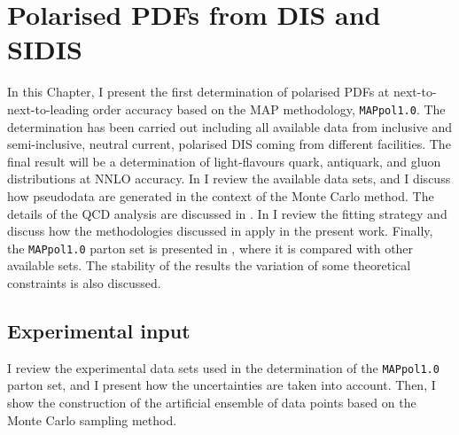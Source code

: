 \chapter{Polarised PDFs from DIS and SIDIS}
\label{ch:4}

In this Chapter, I present the first determination of polarised PDFs at next-to-next-to-leading order accuracy based on the MAP methodology, \texttt{MAPpol1.0}. The determination has been carried out including all available data from inclusive and semi-inclusive, neutral current, polarised DIS coming from different facilities. The final result will be a determination of light-flavours quark, antiquark, and gluon distributions at NNLO accuracy. In  I review the available data sets, and I discuss how pseudodata are generated in the context of the Monte Carlo method. The details of the QCD analysis are discussed in . In  I review the fitting strategy and discuss how the methodologies discussed in  apply in the present work. Finally, the \texttt{MAPpol1.0} parton set is presented in , where it is compared with other available sets. The stability of the results the variation of some theoretical constraints is also discussed.

\section{Experimental input}
\label{sec:4.1}

I review the experimental data sets used in the determination of the \texttt{MAPpol1.0} parton set, and I present how the uncertainties are taken into account. Then, I show the construction of the artificial ensemble of data points based on the Monte Carlo sampling method.

